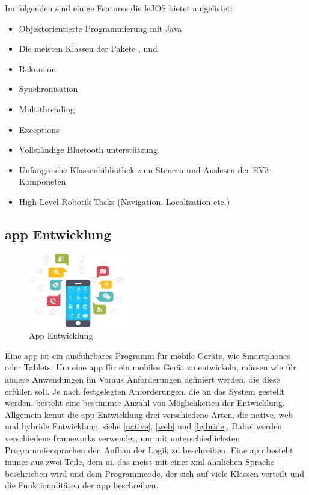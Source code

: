 Im folgenden sind einige Features die leJOS bietet aufgelistet:
\begin{itemize}
	\item{Objektorientierte Programmierung mit Java}
	\item{Die meisten Klassen der Pakete ,  und }
	\item{Rekursion}
	\item{Synchronisation}
	\item{Multithreading}
	\item{Exceptions}
	\item{Vollständige Bluetooth unterstützung}
	\item{Unfangreiche Klassenbibliothek zum Steuern und Auslesen der EV3-Komponeten}
	\item{High-Level-Robotik-Tasks (Navigation, Localization etc.)}
\end{itemize}

\newpage
\subsection{\gls{app} Entwicklung} %

\begin{figure}
	\begin{center}
		\includegraphics[width=0.4\textwidth]{images/technische_grundlagen/App-Development.jpg}
	\end{center}
	\caption{App Entwicklung}
	\label{fig:appentwicklung}
\end{figure}

Eine \gls{app} ist ein ausführbares Programm für mobile Geräte, wie Smartphones oder Tablets. Um eine \gls{app} für ein mobiles Gerät zu entwickeln, müssen wie für andere Anwendungen im Voraus Anforderungen definiert werden, die diese erfüllen soll. Je nach festgelegten Anforderungen, die an das System gestellt werden, besteht eine bestimmte Anzahl von Möglichkeiten der Entwicklung. Allgemein kennt die \gls{app} Entwicklung drei verschiedene Arten, die native, web und hybride Entwicklung, siehe \eqref{native}, \eqref{web} und \eqref{hybride}. Dabei werden verschiedene \glspl{framework} verwendet, um mit unterschiedlichsten Programmiersprachen den Aufbau der Logik zu beschreiben. Eine \gls{app} besteht immer aus zwei Teile, dem \gls{ui}, das meist mit einer \gls{xml} ähnlichen Sprache beschrieben wird und dem Programmcode, der sich auf viele Klassen verteilt und die Funktionalitäten der \gls{app} beschreiben.

